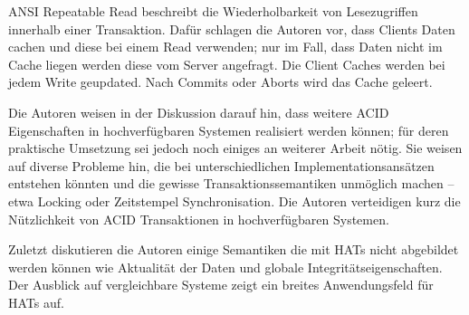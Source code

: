 ANSI Repeatable Read beschreibt die Wiederholbarkeit von Lesezugriffen innerhalb einer Transaktion. Dafür schlagen die Autoren vor, dass Clients Daten cachen und diese bei einem Read verwenden; nur im Fall, dass Daten nicht im Cache liegen werden diese vom Server angefragt. Die Client Caches werden bei jedem Write geupdated. Nach Commits oder Aborts wird das Cache geleert.

Die Autoren weisen in der Diskussion darauf hin, dass weitere ACID Eigenschaften in hochverfügbaren Systemen realisiert werden können; für deren praktische Umsetzung sei jedoch noch einiges an weiterer Arbeit nötig. Sie weisen auf diverse Probleme hin, die bei unterschiedlichen Implementationsansätzen entstehen könnten und die gewisse Transaktionssemantiken unmöglich machen -- etwa Locking oder Zeitstempel Synchronisation. Die Autoren verteidigen kurz die Nützlichkeit von ACID Transaktionen in hochverfügbaren Systemen.

Zuletzt diskutieren die Autoren einige Semantiken die mit HATs nicht abgebildet werden können wie Aktualität der Daten und globale Integritätseigenschaften. Der Ausblick auf vergleichbare Systeme zeigt ein breites Anwendungsfeld für HATs auf.
